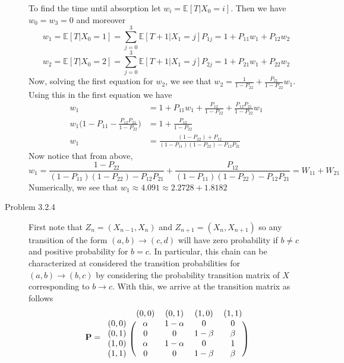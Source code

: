\documentclass[12pt]{article}  %
\newcommand{\E}{{\mathbb{E}}}
\begin{document}
\begin{description}
To find the time until absorption let $w_i = \E[T|X_{0} = i]$. Then we have $w_0 = w_{3} = 0$ and moreover $$w_1 = \E[T|X_{0}=1] = \sum_{j = 0}^{3}\E[T+1|X_1 = j]P_{1j} = 1 + P_{11}w_1 + P_{12}w_2$$
$$w_2 = \E[T|X_{0}=2] = \sum_{j = 0}^{3}\E[T+1|X_1 = j]P_{2j} = 1 + P_{21}w_1 + P_{22}w_2$$ Now, solving the first equation for $w_2$, we see that $w_{2} = \frac{1}{1-P_{22}} + \frac{P_{21}}{1-P_{22}}w_1$. Using this in the first equation we have
\begin{align*}
w_{1} &= 1 + P_{11}w_1 + \frac{P_{12}}{1-P_{22}} + \frac{P_{12}P_{21}}{1-P_{22}}w_1\\
w_{1}\Big(1 - P_{11} - \frac{P_{12}P_{21}}{1-P_{22}}\Big) &= 1 + \frac{P_{12}}{1-P_{22}}\\
w_{1} &= \frac{(1-P_{22}) + P_{12}}{(1-P_{11})(1-P_{22}) - P_{12}P_{21}}
\end{align*}
Now notice that from above, 
$$w_{1} = \frac{1-P_{22}}{(1-P_{11})(1-P_{22}) - P_{12}P_{21}} + \frac{P_{12}}{(1-P_{11})(1-P_{22}) - P_{12}P_{21}} = W_{11} + W_{21}$$
Numerically, we see that $w_1 \approx 4.091 \approx 2.2728 + 1.8182$

\item[Problem 3.2.4] First note that $Z_{n} = (X_{n-1},X_n)$ and $Z_{n+1} = (X_{n}, X_{n+1})$ so any transition of the form $(a,b)\to(c,d)$ will have zero probability if $b\neq c$ and positive probability for $b = c$. In particular, this chain can be characterized at considered the transition probabilities for $(a,b)\to(b,c)$ by considering the probability transition matrix of $X$ corresponding to $b\to c$. With this, we arrive at the transition matrix as follows 
\[\mathbf{P}=
\begin{blockarray}{ccccc}
& (0,0) & (0,1) & (1,0) & (1,1)\\
\begin{block}{c(cccc)}
  (0,0) & \alpha & 1-\alpha & 0 & 0 \\
  (0,1) & 0 & 0 & 1-\beta & \beta\\
  (1,0) & \alpha & 1-\alpha & 0 & 1\\
  (1,1) & 0 & 0 & 1-\beta & \beta\\
\end{block}
\end{blockarray}
 \]


\end{description}
\end{document}
